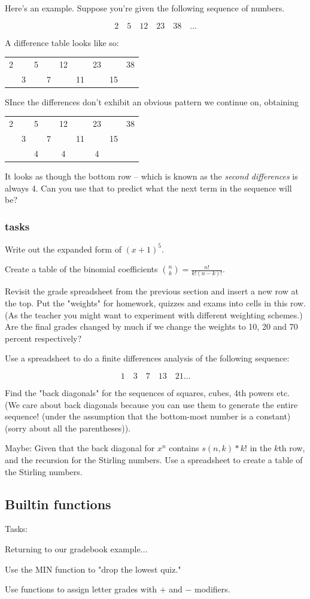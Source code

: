  Here's an example.  Suppose you're given the following sequence of numbers.
 
 \[ 2 \quad 5 \quad 12 \quad 23 \quad 38 \quad \ldots \]
 
 A difference table looks like so:
 
 \begin{tabular}{ccccccccc}
 	2 &  & 5 & & 12 & & 23 & & 38 \\
 	   & 3 & & 7 & & 11 & & 15 
 \end{tabular}

SInce the differences don't exhibit an obvious pattern we continue on, obtaining

\begin{tabular}{ccccccccc}
	2 &  & 5 & & 12 & & 23 & & 38 \\
	& 3 & & 7 & & 11 & & 15 & \\
	& & 4 &  & 4  &  & 4 & & \\ 
\end{tabular}

It looks as though the bottom row -- which is known as the {\em second differences} is always 4.  Can you use that to predict what the next term in the sequence will be?

\subsubsection{tasks}

Write out the expanded form of $(x+1)^5$.

Create a table of the binomial coefficients $\binom{n}{k} = \frac{n!}{k!(n-k)!}$.

Revisit the grade spreadsheet from the previous section and insert a new row at the top.  Put the "weights" for homework, 
quizzes and exams into cells in this row.  (As the teacher you might want to experiment with different 
weighting schemes.) Are the final grades changed by much if we change the weights to 10, 
20 and 70 percent respectively?


Use a spreadsheet to do a finite differences analysis of the following sequence:

	  \[ 1 \quad 3 \quad 7 \quad 13 \quad 21 \ldots \]

Find the "back diagonals" for the sequences of squares, cubes, 4th powers etc.
(We care about back diagonals because you can use them to generate the entire sequence! (under the assumption that the bottom-most number is a constant) (sorry about all the parentheses)).

Maybe:
Given that the back diagonal for $x^n$ contains $s(n,k)*k!$ in the $k$th row, and the recursion for
the Stirling numbers.  Use a spreadsheet to create a table of the Stirling numbers.

\subsection{Builtin functions}

Tasks:

Returning to our gradebook example$\ldots$

Use the MIN function to "drop the lowest quiz."

Use functions to assign letter grades with $+$ and $-$ modifiers.
